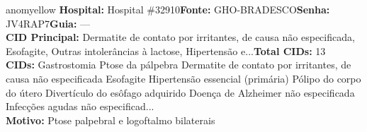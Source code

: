 \documentclass[a4paper,10pt]{article}
\begin{document}
\begin{anomalycard}[Interna\c{c}\~{a}o \#119695 | Pac. \#57865 | MODERADO (z=2.71) | LOS: 1d | 03/03/2026\,$\to$\,04/03/2026]{anomyellow}
\textbf{Hospital:} Hospital \#32910\quad \textbf{Fonte:} GHO-BRADESCO\quad \textbf{Senha:} JV4RAP7\quad \textbf{Guia:} ---\\

\textbf{CID Principal:} {\small Dermatite de contato por irritantes, de causa não especificada, Esofagite, Outras intolerâncias à lactose, Hipertensão e...}\quad\textbf{Total CIDs:} 13\\

\textbf{CIDs:} {\scriptsize Gastrostomia \textbar{} Ptose da pálpebra \textbar{} Dermatite de contato por irritantes, de causa não especificada \textbar{} Esofagite \textbar{} Hipertensão essencial (primária) \textbar{} Pólipo do corpo do útero \textbar{} Divertículo do esôfago adquirido \textbar{} Doença de Alzheimer não especificada \textbar{} Infecções agudas não especificad...}\\

\textbf{Motivo:} {\scriptsize Ptose palpebral e logoftalmo bilaterais}\\




\end{anomalycard}
\end{document}
